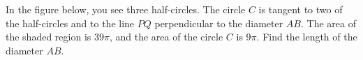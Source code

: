 In the figure below, you see three half-circles. The circle $C$ is tangent to two of the half-circles and to the line $PQ$ perpendicular to the diameter $AB$. The area of the shaded region is $39\pi$,  and the area of the circle $C$ is $9\pi$. Find the length of the diameter $AB$.
